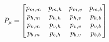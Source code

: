 \documentclass[10pt]{article}
\begin{document}
$\\
P_{\mu}  = 
\begin{bmatrix}
p_{m,m} & p_{m,h}  & p_{m,v} & p_{m,b}  \\
p_{h,m} & p_{h,h}  & p_{h,v} & p_{h,b} \\
p_{v,m} & p_{v,h} & p_{v,v} & p_{v,b}\\
p_{b,m} & p_{b,h} & p_{b,v} & p_{b,b}\\
\end{bmatrix}
$
\end{document}
